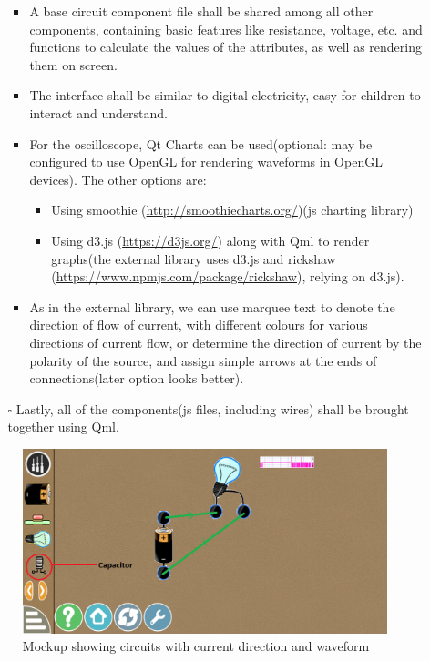 \documentclass[preprint,12pt]{elsarticle}
\begin{document}
\begin{itemize}
\begin{itemize}
\begin{itemize}
					\item {A base circuit component file shall be shared among all other components, containing basic features like resistance, voltage, etc. and functions to calculate the values of the attributes, as well as rendering them on screen.}
					
					\item {The interface shall be similar to digital electricity, easy for children to interact and understand.}
					
					\item {For the oscilloscope, Qt Charts can be used(optional: may be configured to use OpenGL for rendering waveforms in OpenGL devices). The other options are:}
					
						\begin{itemize}
							\item {Using smoothie (\href{http://smoothiecharts.org/}{http://smoothiecharts.org/})(js charting library)}
							
							\item {Using d3.js (\href{https://d3js.org/}{https://d3js.org/}) along with Qml to render graphs(the external library uses d3.js and rickshaw (\href{https://www.npmjs.com/package/rickshaw}{https://www.npmjs.com/package/rickshaw}), relying on d3.js).}
						\end{itemize}					
					
					\item {As in the external library, we can use marquee text to denote the direction of flow of current, with different colours for various directions of current flow, or determine the direction of current by the polarity of the source, and assign simple arrows at the ends of connections(later option looks better).}\\
					\end{itemize}
					
					\item[$\square$] {Lastly, all of the components(js files, including wires) shall be brought together using Qml.}			
				\end{itemize}
				
				\begin{figure}[H]
				\centering\includegraphics[width=0.9\linewidth]{./images/gsoc5}
				\caption{Mockup showing circuits with current direction and waveform}
				\end{figure}
				

\end{itemize}
\end{document}
